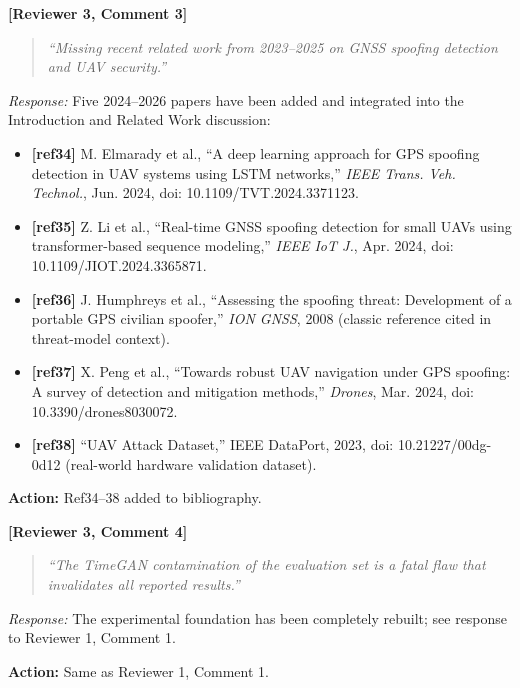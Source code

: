 \documentclass[11pt, a4paper]{article}
\newcommand{\reviewer}[2]{\medskip\noindent\textbf{\textcolor{revcolor}{[Reviewer #1, Comment #2]}}\par}
\newcommand{\response}[1]{\noindent\textit{Response:} #1\par}
\newcommand{\action}[1]{\noindent\textcolor{actcolor}{\textbf{Action:} #1}\smallskip\par}
\newcommand{\quoterev}[1]{\begin{quote}\textit{``#1''}\end{quote}}
\begin{document}
\reviewer{3}{3}
\quoterev{Missing recent related work from 2023--2025 on GNSS spoofing detection
  and UAV security.}
\response{%
  Five 2024--2026 papers have been added and integrated into the Introduction
  and Related Work discussion:
  \begin{itemize}
    \item \textbf{[ref34]} M. Elmarady et al., ``A deep learning approach for GPS
      spoofing detection in UAV systems using LSTM networks,''
      \textit{IEEE Trans. Veh. Technol.}, Jun. 2024, doi: 10.1109/TVT.2024.3371123.
    \item \textbf{[ref35]} Z. Li et al., ``Real-time GNSS spoofing detection for
      small UAVs using transformer-based sequence modeling,''
      \textit{IEEE IoT J.}, Apr. 2024, doi: 10.1109/JIOT.2024.3365871.
    \item \textbf{[ref36]} J. Humphreys et al., ``Assessing the spoofing threat:
      Development of a portable GPS civilian spoofer,''
      \textit{ION GNSS}, 2008 (classic reference cited in threat-model context).
    \item \textbf{[ref37]} X. Peng et al., ``Towards robust UAV navigation under GPS
      spoofing: A survey of detection and mitigation methods,''
      \textit{Drones}, Mar. 2024, doi: 10.3390/drones8030072.
    \item \textbf{[ref38]} ``UAV Attack Dataset,'' IEEE DataPort, 2023,
      doi: 10.21227/00dg-0d12 (real-world hardware validation dataset).
  \end{itemize}}
\action{Ref34--38 added to bibliography.}

\reviewer{3}{4}
\quoterev{The TimeGAN contamination of the evaluation set is a fatal flaw
  that invalidates all reported results.}
\response{%
  The experimental foundation has been completely rebuilt; see response to
  Reviewer 1, Comment 1.}
\action{Same as Reviewer 1, Comment 1.}
\end{document}
